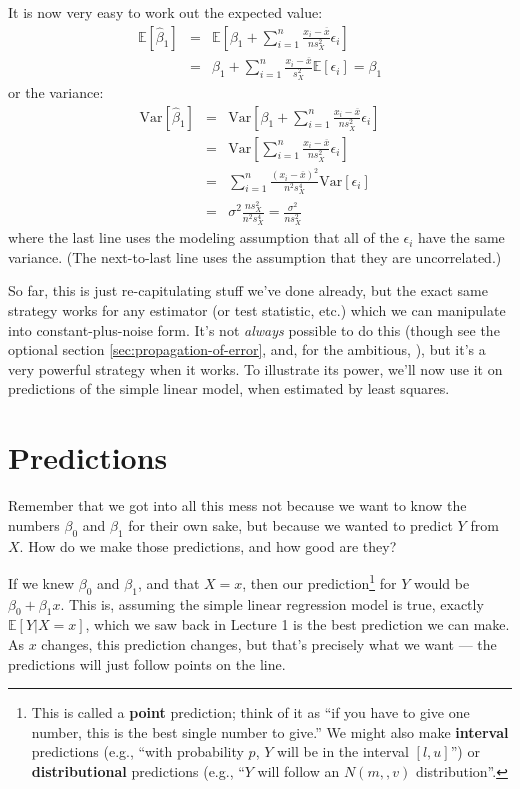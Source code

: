 \documentclass{article}
\newcommand{\Expect}[1]{\mathbb{E}\left[ #1 \right]}
\newcommand{\Var}[1]{\mathrm{Var}\left[ #1 \right]}
\begin{document}
It is now very easy to work out the expected value:
\begin{eqnarray}
\Expect{\hat{\beta}_1} & = & \Expect{\beta_1 + \sum_{i=1}^{n}{\frac{x_i - \overline{x}}{ns^2_X}\epsilon_i}} \\
& = & \beta_1 + \sum_{i=1}^{n}{\frac{x_i - \overline{x}}{s^2_X}\Expect{\epsilon_i}} = \beta_1
\end{eqnarray}
or the variance:
\begin{eqnarray}
\Var{\hat{\beta}_1} & = & \Var{\beta_1 + \sum_{i=1}^{n}{\frac{x_i - \overline{x}}{ns^2_X}\epsilon_i}}\\
& = & \Var{\sum_{i=1}^{n}{\frac{x_i - \overline{x}}{ns^2_X}\epsilon_i}}\\
& = & \sum_{i=1}^{n}{\frac{(x_i - \overline{x})^2}{n^2 s^4_X}\Var{\epsilon_i}}\\
& = & \sigma^2 \frac{n s^2_X}{n^2 s^4_X} = \frac{\sigma^2}{ns^2_X}
\end{eqnarray}
where the last line uses the modeling assumption that all of the $\epsilon_i$
have the same variance.  (The next-to-last line uses the assumption that they
are uncorrelated.)

So far, this is just re-capitulating stuff we've done already, but the exact
same strategy works for any estimator (or test statistic, etc.) which we can
manipulate into constant-plus-noise form.  It's not {\em always} possible to do
this (though see the optional section \ref{sec:propagation-of-error}, and, for
the ambitious, \citealt{van-der-Vaart-asymptotic-stats}), but it's a very
powerful strategy when it works.  To illustrate its power, we'll now use
it on predictions of the simple linear model, when estimated by least squares.


\section{Predictions}
\label{sec:prediction}

Remember that we got into all this mess not because we want to know
the numbers $\beta_0$ and $\beta_1$ for their own sake, but because we wanted
to predict $Y$ from $X$.  How do we make those predictions, and how good
are they?

If we knew $\beta_0$ and $\beta_1$, and that $X=x$, then our
prediction\footnote{This is called a {\bf point} prediction; think of it as
  ``if you have to give one number, this is the best single number to give.''
  We might also make {\bf interval} predictions (e.g., ``with probability $p$,
  $Y$ will be in the interval $[l, u]$'') or {\bf distributional} predictions
  (e.g., ``$Y$ will follow an $N(m,,v)$ distribution''.} for $Y$ would be
$\beta_0 + \beta_1 x$.  This is, assuming the simple linear regression model is
true, exactly $\Expect{Y|X=x}$, which we saw back in Lecture 1 is the best
prediction we can make.  As $x$ changes, this prediction changes, but that's
precisely what we want --- the predictions will just follow points on the line.
\end{document}
